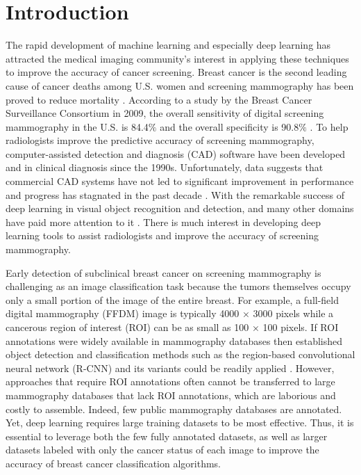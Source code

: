 \documentclass[12pt]{article}
\begin{document}
\section{Introduction}
\label{sec:Intro}

The rapid development of machine learning and 
especially deep learning has attracted the medical 
imaging community’s interest in applying these 
techniques to improve the accuracy of cancer 
screening. Breast cancer is the second leading 
cause of cancer deaths among U.S. women and 
screening mammography has been proved to reduce 
mortality
\citep{Oeffinger2015,Zhu2019}.
According to a study by the Breast 
Cancer Surveillance Consortium in 2009, the 
overall sensitivity of digital screening mammography 
in the U.S. is 84.4$\%$ and the overall specificity 
is 90.8$\%$
\citep{Jamieson2012}.
To help radiologists improve 
the predictive accuracy of screening mammography, 
computer-assisted detection and diagnosis (CAD) 
software have been developed and in clinical 
diagnosis since the 1990s. Unfortunately, data 
suggests that commercial CAD systems have not led 
to significant improvement in performance and 
progress has stagnated in the past decade
\citep{Girshick2015}.
With the remarkable success of deep learning in 
visual object recognition and detection, and many 
other domains have paid more attention to it
\citep{Lecun2015}.
There is much interest in developing deep 
learning tools to assist radiologists and improve 
the accuracy of screening mammography. 

Early detection of subclinical breast cancer on 
screening mammography is challenging as an image
classification task because the tumors themselves 
occupy only a small portion of the image of the
entire breast. For example, a full-field digital 
mammography (FFDM) image is typically 4000 × 3000
pixels while a cancerous region of interest (ROI) 
can be as small as 100 × 100 pixels. If ROI
annotations were widely available in mammography 
databases then established object detection and
classification methods such as the region-based 
convolutional neural network (R-CNN) and its
variants could be readily applied
\citep{Girshick2014,Girshick2015,Ren2017}.
However, approaches that require ROI annotations 
\citep{Dai2016}
often cannot be transferred to large mammography 
databases that lack ROI annotations, which are
laborious and costly to assemble. Indeed, few 
public mammography databases are annotated.
Yet, deep learning requires large training datasets 
to be most effective. Thus, it is essential to 
leverage both the few fully annotated datasets, as 
well as larger datasets labeled with only the 
cancer status of each image to improve the accuracy 
of breast cancer classification algorithms.
\end{document}
